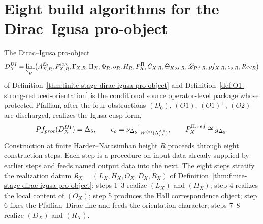 %
%

\section{Eight build algorithms for the Dirac--Igusa pro-object}
\label{app:eight-build-algorithms}

The Dirac--Igusa pro-object
\[
\mathfrak D_X^{\mathrm{DI}}
=\varprojlim_R
\bigl(
\mathcal A^{E_3}_{X,R},
\mathcal F_{X,R}^{\mathrm{hyb}},
\Gamma_{X,R},
\Pi_X,
\Phi_R,
o_R,
\mathcal H_R,
P_R^\Pi,
C_{X,R},
\Theta_{\mathrm{Kos},R},
\mathscr L_{\mathrm{Pf},R},
\operatorname{pf}_{X,R},
\epsilon_{o,R},
\mathrm{Rec}_R
\bigr)
\]
of Definition~\ref{thm:finite-stage-dirac-igusa-pro-object} and
Definition~\ref{def:O1-strong-reduced-orientation} is the conditional source
operator-level package whose protected Pfaffian, after the four
obstructions \((D_0)\), \((O1)\), \((O1)^+\), \((O2)\) are discharged,
realizes the Igusa cusp form,
\[
\operatorname{Pf}_{\mathrm{prot}}(\mathfrak D_X^{\mathrm{DI}})=\Delta_5,\qquad
\epsilon_o=\nu_{\Delta_5}\big|_{W^{(2)}(\La^{2,1}_{II})},\qquad
P_X^{\Pi,\mathrm{red}}\cong\fg_{\Delta_5}.
\]
Construction at finite Harder--Narasimhan height \(R\) proceeds through
eight construction steps.  Each step is a procedure on input data
already supplied by earlier steps and feeds named output data into the
next.  The eight steps stratify the realization datum
\(\mathfrak K_X=(L_X,H_X,O_X,D_X,R_X)\) of
Definition~\ref{thm:finite-stage-dirac-igusa-pro-object}: steps 1--3
realize \((L_X)\) and \((H_X)\); step 4 realizes the local content of
\((O_X)\); step 5 produces the Hall correspondence object; step 6 fixes
the Pfaffian--Dirac line and feeds the orientation character; steps 7--8
realize \((D_X)\) and \((R_X)\).


